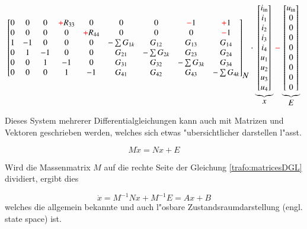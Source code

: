 \begin{refsection}
{\begin{align}
{\begin{bmatrix}
			0&0&0&\color{red}+\color{black}R_{33}&0 & 0&0&\color{red}-\color{black}1&\color{red}+\color{black}1 \\
			0&0&0&0&\color{red}+\color{black}R_{44} & 0&0&0&\color{red}-\color{black}1 \\
			1&-1&0&0&0 & -\sum G_{1k}&G_{12}&G_{13}&G_{14} \\
			0&1&-1&0&0 & G_{21} &- \sum G_{2k}& G_{23}& G_{24} \\
			0&0&1&-1&0 & G_{31} & G_{32} &-\sum G_{3k}&G_{34} \\
			0&0&0&1&-1 & G_{41}&G_{42}&G_{43}&-\sum G_{4k}
			\end{bmatrix}}_{\displaystyle N}
			\cdot
			\underbrace{\begin{bmatrix}
			i_\mathrm{in} \\
			i_1 \\
			i_2 \\
			i_3 \\
			i_4 \\
			u_1 \\
			u_2 \\
			u_3 \\
			u_4
			\end{bmatrix}}_{\displaystyle x}
			\color{red}-\color{black}
			\underbrace{\begin{bmatrix}
			u_\mathrm{in} \\
			0 \\
			0 \\
			0 \\
			0 \\
			0 \\
			0 \\
			0 \\
			0
			\end{bmatrix}}_{\displaystyle E}
			\label{trafo:symmetricalDGL}
\end{align}
}

Dieses System mehrerer Differentialgleichungen kann auch mit Matrizen und Vektoren geschrieben werden, welches sich etwas "ubersichtlicher darstellen l"asst. 

\begin{equation}
	M \dot x = N x + E
	\label{trafo:matricesDGL}
\end{equation}

Wird die Massenmatrix $M$ auf die rechte Seite der Gleichung \ref{trafo:matricesDGL} dividiert, ergibt dies

\begin{equation}
	\dot{x} = M^{-1}N x + M^{-1} E = A x + B
\end{equation}
welches die allgemein bekannte und auch l"osbare Zustandsraumdarstellung  (engl. state space) ist.


\end{refsection}
